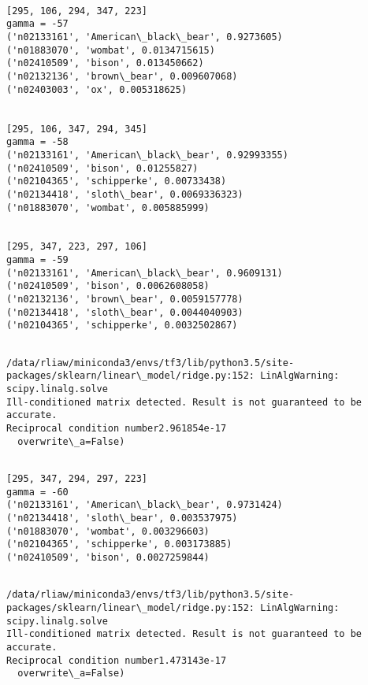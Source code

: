 \documentclass[11pt]{article}
\begin{document}
    \begin{Verbatim}[commandchars=\\\{\}]

[295, 106, 294, 347, 223]
gamma = -57
('n02133161', 'American\_black\_bear', 0.9273605)
('n01883070', 'wombat', 0.0134715615)
('n02410509', 'bison', 0.013450662)
('n02132136', 'brown\_bear', 0.009607068)
('n02403003', 'ox', 0.005318625)


[295, 106, 347, 294, 345]
gamma = -58
('n02133161', 'American\_black\_bear', 0.92993355)
('n02410509', 'bison', 0.01255827)
('n02104365', 'schipperke', 0.00733438)
('n02134418', 'sloth\_bear', 0.0069336323)
('n01883070', 'wombat', 0.005885999)


[295, 347, 223, 297, 106]
gamma = -59
('n02133161', 'American\_black\_bear', 0.9609131)
('n02410509', 'bison', 0.0062608058)
('n02132136', 'brown\_bear', 0.0059157778)
('n02134418', 'sloth\_bear', 0.0044040903)
('n02104365', 'schipperke', 0.0032502867)


    \end{Verbatim}

    \begin{Verbatim}[commandchars=\\\{\}]
/data/rliaw/miniconda3/envs/tf3/lib/python3.5/site-packages/sklearn/linear\_model/ridge.py:152: LinAlgWarning: scipy.linalg.solve
Ill-conditioned matrix detected. Result is not guaranteed to be accurate.
Reciprocal condition number2.961854e-17
  overwrite\_a=False)

    \end{Verbatim}

    \begin{Verbatim}[commandchars=\\\{\}]

[295, 347, 294, 297, 223]
gamma = -60
('n02133161', 'American\_black\_bear', 0.9731424)
('n02134418', 'sloth\_bear', 0.003537975)
('n01883070', 'wombat', 0.003296603)
('n02104365', 'schipperke', 0.003173885)
('n02410509', 'bison', 0.0027259844)


    \end{Verbatim}

    \begin{Verbatim}[commandchars=\\\{\}]
/data/rliaw/miniconda3/envs/tf3/lib/python3.5/site-packages/sklearn/linear\_model/ridge.py:152: LinAlgWarning: scipy.linalg.solve
Ill-conditioned matrix detected. Result is not guaranteed to be accurate.
Reciprocal condition number1.473143e-17
  overwrite\_a=False)

    \end{Verbatim}
\end{document}
